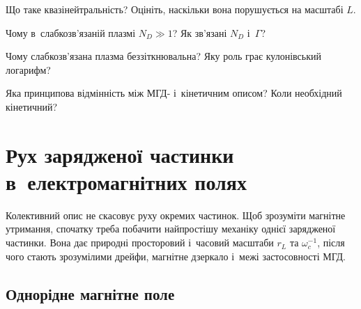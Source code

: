 \begin{Questions}
\begin{quizlist}
\item Що таке квазінейтральність? Оцініть, наскільки вона порушується на масштабі
		  $L$.

\item Чому в~слабкозв'язаній плазмі $N_D\gg1$? Як зв'язані $N_D$ і~$\Gamma$?

\item Чому слабкозв'язана плазма беззіткнювальна? Яку роль грає кулонівський
		  логарифм?

\item Яка принципова відмінність між МГД- і~кінетичним описом? Коли необхідний
		  кінетичний?

\end{quizlist}
\end{Questions}

\chapter{Рух зарядженої частинки в~електромагнітних полях}\label{sec:particle-motion}\hypertarget{particle-motion}{}

Колективний опис не скасовує руху окремих частинок. Щоб зрозуміти магнітне утримання,
спочатку треба побачити найпростішу механіку однієї зарядженої частинки. Вона дає природні
просторовий і~часовий масштаби $r_L$ та $\omega_c^{-1}$, після чого стають зрозумілими
дрейфи, магнітне дзеркало і~межі застосовності МГД.



\section{Однорідне магнітне поле}



